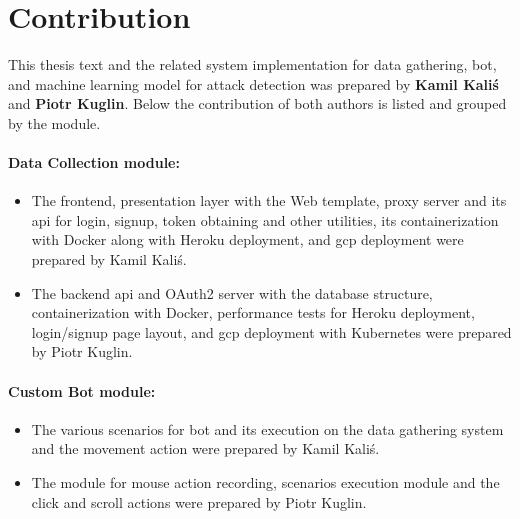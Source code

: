 \section{Contribution}\label{sec:contribution}
This thesis text and the related system implementation for data gathering, bot, and machine learning model for attack detection was prepared by \textbf{Kamil Kaliś} and \textbf{Piotr Kuglin}.
Below the contribution of both authors is listed and grouped by the module.

\begin{minipage}{\textwidth}
    \paragraph{Data Collection module:}
    \begin{itemize}[label=$\bullet$]
        \item The frontend, presentation layer with the Web template, proxy server and its \gls{api} for login, signup, token obtaining and other utilities, its containerization with Docker along with Heroku deployment, and \gls{gcp} deployment were prepared by Kamil Kaliś.
        \item The backend \gls{api} and OAuth2 server with the database structure, containerization with Docker, performance tests for Heroku deployment, login/signup page layout, and \gls{gcp} deployment with Kubernetes were prepared by Piotr Kuglin.
    \end{itemize}
\end{minipage}

\begin{minipage}{\textwidth}
    \paragraph{Custom Bot module:}
    \begin{itemize}[label=$\bullet$]
        \item The various scenarios for bot and its execution on the data gathering system and the movement action were prepared by Kamil Kaliś.
        \item The module for mouse action recording, scenarios execution module and the click and scroll actions were prepared by Piotr Kuglin.
    \end{itemize}
\end{minipage}

